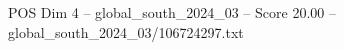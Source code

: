 \begin{textsample}{POS Dim 4 – global\_south\_2024\_03 – Score 20.00 – global\_south\_2024\_03/106724297.txt}
\end{textsample}
